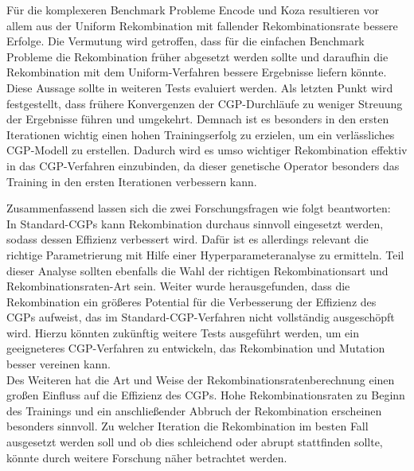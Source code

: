 Für die komplexeren Benchmark Probleme Encode und Koza resultieren vor allem aus der Uniform Rekombination mit fallender Rekombinationsrate bessere Erfolge.
Die Vermutung wird getroffen, dass für die einfachen Benchmark Probleme die Rekombination früher abgesetzt werden sollte und daraufhin die Rekombination mit dem Uniform-Verfahren bessere Ergebnisse liefern könnte.
Diese Aussage sollte in weiteren Tests evaluiert werden.
Als letzten Punkt wird festgestellt, dass frühere Konvergenzen der CGP-Durchläufe zu weniger Streuung der Ergebnisse führen und umgekehrt.
Demnach ist es besonders in den ersten Iterationen wichtig einen hohen Trainingserfolg zu erzielen, um ein verlässliches CGP-Modell zu erstellen.
Dadurch wird es umso wichtiger Rekombination effektiv in das CGP-Verfahren einzubinden, da dieser genetische Operator besonders das Training in den ersten Iterationen verbessern kann.

Zusammenfassend lassen sich die zwei Forschungsfragen wie folgt beantworten:\\
In Standard-CGPs kann Rekombination durchaus sinnvoll eingesetzt werden, sodass dessen Effizienz verbessert wird.
Dafür ist es allerdings relevant die richtige Parametrierung mit Hilfe einer Hyperparameteranalyse zu ermitteln.
Teil dieser Analyse sollten ebenfalls die Wahl der richtigen Rekombinationsart und Rekombinationsraten-Art sein.
Weiter wurde herausgefunden, dass die Rekombination ein größeres Potential für die Verbesserung der Effizienz des CGPs aufweist, das im Standard-CGP-Verfahren nicht vollständig ausgeschöpft wird.
Hierzu könnten zukünftig weitere Tests ausgeführt werden, um ein geeigneteres CGP-Verfahren zu entwickeln, das Rekombination und Mutation besser vereinen kann.\\
Des Weiteren hat die Art und Weise der Rekombinationsratenberechnung einen großen Einfluss auf die Effizienz des CGPs. 
Hohe Rekombinationsraten zu Beginn des Trainings und ein anschließender Abbruch der Rekombination erscheinen besonders sinnvoll.
Zu welcher Iteration die Rekombination im besten Fall ausgesetzt werden soll und ob dies schleichend oder abrupt stattfinden sollte, könnte durch weitere Forschung näher betrachtet werden.
